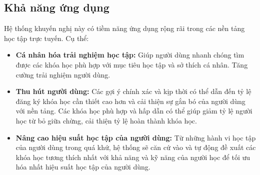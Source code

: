 \subsection{Khả năng ứng dụng}
Hệ thống khuyến nghị này có tiềm năng ứng dụng rộng rãi trong các nền tảng học tập trực tuyến. Cụ thể:
\begin{itemize}
    \item \textbf{Cá nhân hóa trải nghiệm học tập:} Giúp người dùng nhanh chóng tìm được các khóa học phù hợp với mục tiêu học tập và sở thích cá nhân. Tăng cường trải nghiệm người dùng.
    \item \textbf{Thu hút người dùng:} Các gợi ý chính xác và kịp thời có thể dẫn đến tỷ lệ đăng ký khóa học cần thiết cao hơn và cải thiện sự gắn bó của người dùng với nền tảng. Các khóa học phù hợp và hấp dẫn có thể giúp giảm tỷ lệ người học từ bỏ giữa chừng, cải thiện tỷ lệ hoàn thành khóa học.
    \item \textbf{Nâng cao hiệu suất học tập của người dùng:} Từ những hành vi học tập của người dùng trong quá khứ, hệ thống sẽ căn cứ vào và tự động đề xuất các khóa học tương thích nhất với khả năng và kỹ năng của người học để tối ưu hóa nhất hiệu suất học tập của người dùng.
\end{itemize}
